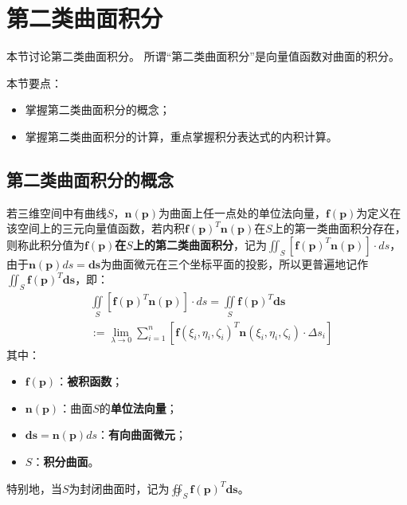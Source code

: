 \section{第二类曲面积分}

本节讨论第二类曲面积分。
所谓“第二类曲面积分”是向量值函数对曲面的积分。

本节要点：
\begin{itemize}
    \item 掌握第二类曲面积分的概念；
    \item 掌握第二类曲面积分的计算，重点掌握积分表达式的内积计算。
\end{itemize}

\subsection{第二类曲面积分的概念}

\begin{definition}[第二类曲面积分]
若三维空间中有曲线$S$，$\mathbf{n}\left( \boldsymbol{p} \right) $为曲面上任一点处的单位法向量，$\boldsymbol{f}\left( \boldsymbol{p} \right) $为定义在该空间上的三元向量值函数，若内积$\boldsymbol{f}\left( \boldsymbol{p} \right) ^T\mathbf{n}\left( \boldsymbol{p} \right) $在$S$上的第一类曲面积分存在，则称此积分值为{\bf $\boldsymbol{f}\left( \boldsymbol{p} \right) $在$S$上的第二类曲面积分}，记为$\iint_S{\left[ \boldsymbol{f}\left( \boldsymbol{p} \right) ^T\mathbf{n}\left( \boldsymbol{p} \right) \right] \cdot ds}$，由于$\mathbf{n}\left( \boldsymbol{p} \right) ds=\boldsymbol{ds}$为曲面微元在三个坐标平面的投影，所以更普遍地记作$\iint_S{\boldsymbol{f}\left( \boldsymbol{p} \right) ^T\boldsymbol{ds}}$，即：
\begin{align*}
&\iint\limits_S{\left[ \boldsymbol{f}\left( \boldsymbol{p} \right) ^T\mathbf{n}\left( \boldsymbol{p} \right) \right] \cdot ds}=\iint\limits_S{\boldsymbol{f}\left( \boldsymbol{p} \right) ^T\boldsymbol{ds}} \\
&:=\underset{\lambda \rightarrow 0}{\lim}\sum_{i=1}^n{\left[ \boldsymbol{f}\left( \xi _i,\eta _i,\zeta _i \right) ^T\mathbf{n}\left( \xi _i,\eta _i,\zeta _i \right) \cdot \Delta s_i \right]}
\end{align*}
其中：
\begin{itemize}
    \item $\boldsymbol{f}\left( \boldsymbol{p} \right) $：{\bf 被积函数}；
    \item $\mathbf{n}\left( \boldsymbol{p} \right) $：曲面$S$的{\bf 单位法向量}；
    \item $\boldsymbol{ds}=\mathbf{n}\left( \boldsymbol{p} \right) ds$：{\bf 有向曲面微元}；
    \item $S$：{\bf 积分曲面}。
\end{itemize}
特别地，当$S$为封闭曲面时，记为$\oiint_S{\boldsymbol{f}\left( \boldsymbol{p} \right) ^T\boldsymbol{ds}}$。
\end{definition}

